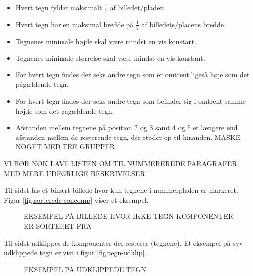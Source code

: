 \begin{itemize}
\item Hvert tegn fylder maksimalt $\frac{1}{7}$ af billedet/pladen.
\item Hvert tegn har en maksimal bredde på $\frac{1}{7}$ af billedets/pladens bredde.
\item Tegnenes minimale højde skal være mindst en vis konstant.%
\item Tegnenes minimale størrelse skal være mindst en vis konstant.%
\item For hvert tegn findes der seks andre tegn som er omtrent ligeså høje som det pågældende tegn.
\item For hvert tegn findes der seks andre tegn som befinder sig i omtrent samme højde som det pågældende tegn.
\item Afstanden mellem tegnene på position 2 og 3 samt 4 og 5 er længere end afstanden mellem de resterende tegn, der støder op til hinanden. MÅSKE NOGET MED TRE GRUPPER.
\end{itemize}
VI BØR NOK LAVE LISTEN OM TIL NUMMEREREDE PARAGRAFER MED MERE UDFØRLIGE BESKRIVELSER.


Til sidst fås et binært billede hvor kun tegnene i nummerpladen er markeret. Figur \vref{fig:sorterede-concomp} viser et eksempel.

\begin{figure}[htp]
  \centering
  \caption{EKSEMPEL PÅ BILLEDE HVOR IKKE-TEGN KOMPONENTER ER SORTERET FRA}
  \label{fig:sorterede-concomp}
\end{figure}

Til sidst udklippes de komponenter der resterer (tegnene). Et eksempel på syv udklippede tegn er vist i figur \vref{fig:tegn-udklip}.

\begin{figure}[htp]
  \centering
  \caption{EKSEMPEL PÅ UDKLIPPEDE TEGN}
  \label{fig:tegn-udklip}
\end{figure}

